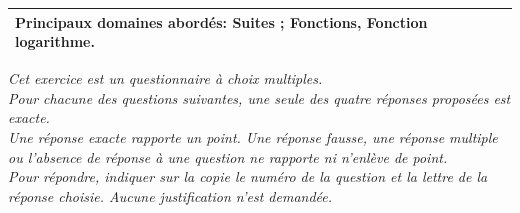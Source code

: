 \medskip

\begin{tabularx}{\linewidth}{|X|}\hline
\textbf{Principaux domaines abordés:} Suites ; Fonctions, Fonction logarithme.\\ \hline
\end{tabularx}

\medskip

\emph{Cet exercice est un questionnaire à choix multiples.\\
Pour chacune des questions suivantes, une seule des quatre réponses proposées
est exacte.\\
Une réponse exacte rapporte un point. Une réponse fausse, une réponse multiple ou
l'absence de réponse à une question ne rapporte ni n'enlève de point.\\
Pour répondre, indiquer sur la copie le numéro de la question et la lettre de la réponse choisie. Aucune justification n'est demandée.}

